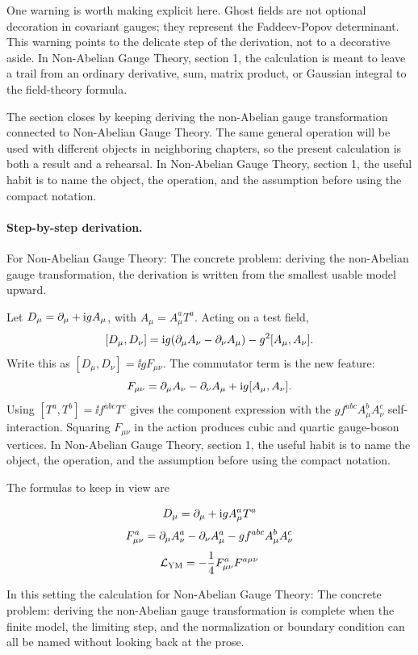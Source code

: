 One warning is worth making explicit here.  Ghost fields are not optional decoration in covariant gauges; they represent the Faddeev-Popov determinant.  This warning points to the delicate step of the derivation, not to a decorative aside.  In Non-Abelian Gauge Theory, section 1, the calculation is meant to leave a trail from an ordinary derivative, sum, matrix product, or Gaussian integral to the field-theory formula.

The section closes by keeping deriving the non-Abelian gauge transformation connected to Non-Abelian Gauge Theory.  The same general operation will be used with different objects in neighboring chapters, so the present calculation is both a result and a rehearsal.  In Non-Abelian Gauge Theory, section 1, the useful habit is to name the object, the operation, and the assumption before using the compact notation.



\paragraph{Step-by-step derivation.}

For Non-Abelian Gauge Theory: The concrete problem: deriving the non-Abelian gauge transformation, the derivation is written from the smallest usable model upward.

Let \(D_\mu=\partial_\mu+\mathrm i gA_\mu\), with \(A_\mu=A_\mu^aT^a\).  Acting on a test field,
\[
  [D_\mu,D_\nu]
  =
  \mathrm i g(\partial_\mu A_\nu-\partial_\nu A_\mu)-g^2[A_\mu,A_\nu].
\]
Write this as \([D_\mu,D_\nu]=\ii gF_{\mu\nu}\).  The commutator term is the new feature:
\[
  F_{\mu\nu}=\partial_\mu A_\nu-\partial_\nu A_\mu+\mathrm i g[A_\mu,A_\nu].
\]
Using \([T^a,T^b]=\ii f^{abc}T^c\) gives the component expression with the \(gf^{abc}A_\mu^bA_\nu^c\) self-interaction.  Squaring \(F_{\mu\nu}\) in the action produces cubic and quartic gauge-boson vertices.  In Non-Abelian Gauge Theory, section 1, the useful habit is to name the object, the operation, and the assumption before using the compact notation.

The formulas to keep in view are

\[
  D_\mu=\partial_\mu+\mathrm i gA_\mu^aT^a
\]
\[
  F_{\mu\nu}^a=\partial_\mu A_\nu^a-\partial_\nu A_\mu^a-gf^{abc}A_\mu^bA_\nu^c
\]
\[
  \mathcal L_{\mathrm{YM}}=-\frac14F_{\mu\nu}^aF^{a\mu\nu}
\]

In this setting the calculation for Non-Abelian Gauge Theory: The concrete problem: deriving the non-Abelian gauge transformation is complete when the finite model, the limiting step, and the normalization or boundary condition can all be named without looking back at the prose.





